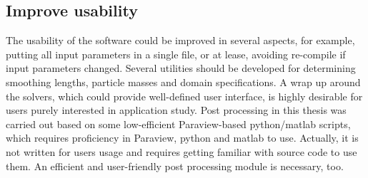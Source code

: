 \subsection{Improve usability}
The usability of the software could be improved in several aspects, for example, putting all input parameters in a single file, or at lease, avoiding re-compile if input parameters changed. Several utilities should be developed for determining smoothing lengths, particle masses and domain specifications.
A wrap up around the solvers, which could provide well-defined user interface, is highly desirable for users purely interested in application study. Post processing in this thesis was carried out based on some low-efficient Paraview-based python/matlab scripts, which requires proficiency in Paraview, python and matlab to use. Actually, it is not written for users usage and requires getting familiar with source code to use them. An efficient and user-friendly post processing module is necessary, too.

